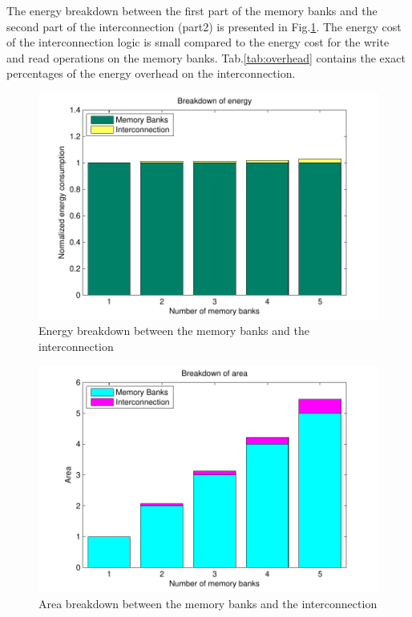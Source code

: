 \documentclass[12pt,a4paper]{article}
\begin{document}
The energy breakdown between the first part of the memory banks and the second part of the interconnection (part2) is presented in Fig.\ref{fig:energyE}.
The energy cost of the interconnection logic is small compared to the energy cost for the write and read operations on the memory banks.
Tab.\ref{tab:overhead} contains the exact percentages of the energy overhead on the interconnection. 

\begin{figure}[t!]
 \centering
 \includegraphics[width = \textwidth]{energy.pdf}
  \caption{Energy breakdown between the memory banks and the interconnection}
 \label{fig:energyE}
 \end{figure}
 
 \begin{figure}[t!]
 \centering
 \includegraphics[width = \textwidth]{area.pdf}
  \caption{Area breakdown between the memory banks and the interconnection}
 \label{fig:areaE}
 \end{figure}
 
\end{document}
